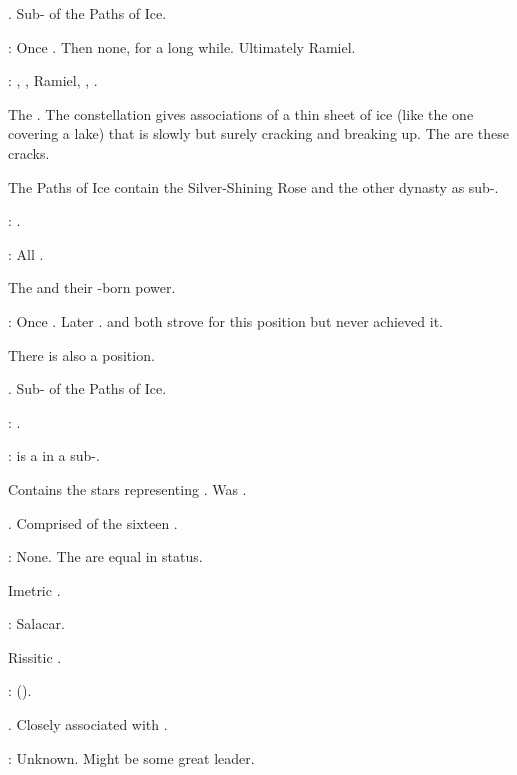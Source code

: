 \begin{gloss}
    . 
    Sub-\matrix{} of the Paths of Ice. 
    
    \Apex: 
    Once \Zachirah. 
    Then none, for a long while. 
    Ultimately Ramiel. 
    
    \CardinalPoints: 
    \Nathrach, \Shiaraid, Ramiel, \Dasteron, \Kishiel. 
  
    The \banelords.
    The constellation gives associations of a thin sheet of ice (like the one covering a lake) that is slowly but surely cracking and breaking up. 
    The  are these cracks. 
    
    The Paths of Ice contain the Silver-Shining Rose and the other dynasty \matrices{} as sub-\matrices. 
    
    \Apex: 
    \Daggerrain. 
    
    \CardinalPoints: All \banelords. 
  
    The \dragons{} and their \xs-born power. 
    
    \Apex: 
    Once \TyarithXserasshana. 
    Later \Vizsherioch. 
    \Nexagglachel{} and \Secherdamon{} both strove for this position but never achieved it. 
    
    There is also a  position. 
  
   \CiriathSepher. 
    Sub-\matrix{} of the Paths of Ice. 
    
    \Apex:
    \Azraid. 
    
    \CardinalPoints: 
    \Teshrial{} is a \cardinalpoint{} in a sub-\matrix.
  
  \gitemthe{\Malgryph}
    Contains the stars representing . 
    Was . 
  
  
  
    \Iquinian{} \matrix.
    Comprised of the sixteen \sephiroth. 
    
    \Apex: 
    None. The \sephiroth{} are equal in status. 
  
    Imetric \matrix. 
    
    \Apex: 
    Salacar. 
  
    Rissitic \matrix. 
    
    \Apex: 
    \HriistN{} (\Secherdamon). 
  
    \Vorcanth{} \matrix.
    Closely associated with . 
    
    \Apex: 
    Unknown. 
    Might be some great \vorcanth{} leader. 
\end{gloss}





